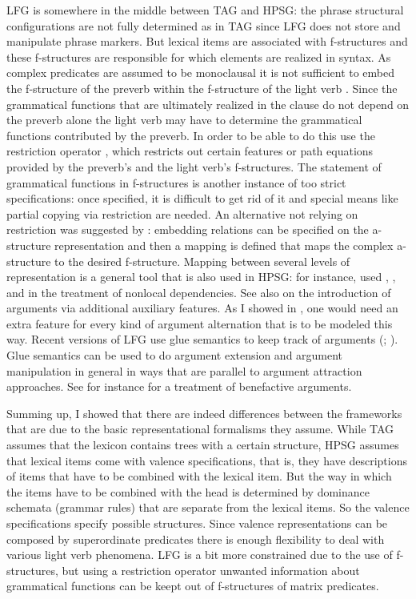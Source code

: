 LFG is somewhere in the middle between TAG and HPSG: the phrase structural configurations are not
fully determined as in TAG since LFG does not store and manipulate phrase markers. But lexical items are
associated with f-structures and these f-structures are responsible for which elements are realized
in syntax. As complex predicates are assumed to be monoclausal it is not sufficient to embed the
f-structure of the preverb within the f-structure of the light verb \citep{BHKM2003a-u}. Since the grammatical functions
that are ultimately realized in the clause do not depend on the preverb alone the light verb may have
to determine the grammatical functions contributed by the preverb. In order to be able to do this \citet{BHKM2003a-u}
use the restriction operator \citep{KW93a-u}, which restricts out certain features or path equations provided by the
preverb's and the light verb's f-structures. The statement of grammatical functions in
f-structures is another instance of too strict specifications: once specified, it is difficult to get rid of it and special means like partial copying via
restriction are needed. 
An alternative not relying on restriction was suggested by \citet{Butt97a}:
embedding relations can be specified on the a-structure representation and then a mapping is defined
that maps the complex a-structure to the desired f-structure. Mapping between several levels of
representation is a general tool that is also used in HPSG: for instance, \citet*{BMS2001a} used
\argst, \deps, and \comps in the treatment of nonlocal dependencies. See also \citet{Koenig99a} on
the introduction of arguments via additional auxiliary features. As I showed in
\citet[Section~7.5.2.2]{MuellerLehrbuch1}, one would need an extra feature for every kind of argument alternation
that is to be modeled this way. Recent versions of LFG use glue semantics to keep track of arguments
(\citealp*{DLS93a-u}; \citealp[Chapter~8]{Dalrymple2001a-u}). Glue semantics can
be used to do argument extension and argument manipulation in general in ways that are parallel to
argument attraction approaches. See for instance  for a treatment of
benefactive arguments. 


Summing up, I showed that there are indeed differences between the frameworks that are due to the
basic representational formalisms they assume. While TAG assumes that the lexicon contains
trees with a certain structure, HPSG assumes that lexical items come with valence specifications,
that is, they have descriptions of items that have to be combined with the lexical item. But the way
in which the items have to be combined with the head is determined by dominance schemata (grammar
rules) that are separate from the lexical items. So the valence specifications specify possible
structures. Since valence
representations can be composed by superordinate predicates there is enough flexibility to deal with
various light verb phenomena. LFG is a bit more constrained due to the use of f-structures, but using
a restriction operator unwanted information about grammatical functions can be keept out of
f-structures of matrix predicates.









